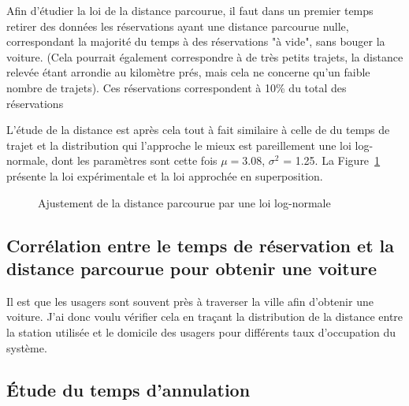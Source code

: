 \documentclass[12pt,a4paper]{article}
\newcommand{\1}[1]{\mathbbm{1}_{\{#1\}} }
\theoremstyle{definition}
\begin{document}
{Afin d'étudier la loi de la distance parcourue, il faut dans un premier temps retirer des données les réservations ayant une distance parcourue nulle, correspondant la majorité du temps à des réservations "à vide", sans bouger la voiture. (Cela pourrait également correspondre à de très petits trajets, la distance relevée étant arrondie au kilomètre prés, mais cela ne concerne qu'un faible nombre de trajets). Ces réservations correspondent à 10\% du total des réservations

L'étude de la distance est après cela tout à fait similaire à celle de du temps de trajet et la distribution qui l'approche le mieux est pareillement une loi log-normale, dont les paramètres sont cette fois $\mu = 3.08 $, $\sigma^2$ = 1.25. La Figure~\ref{Ajustement_distance} présente la loi expérimentale et la loi approchée en superposition.

\begin{figure}[!h]
\centering
{}
\caption{Ajustement de la distance parcourue par une loi log-normale}
\label{Ajustement_distance}
\end{figure}

\subsection{Corrélation entre le temps de réservation et la distance parcourue pour obtenir une voiture}

Il est que les usagers sont souvent près à traverser la ville afin d'obtenir une voiture. J'ai donc voulu vérifier cela en traçant la distribution de la distance entre la station utilisée et le domicile des usagers pour différents taux d'occupation du système.
\subsection{Étude du temps d'annulation}



}
\end{document}
